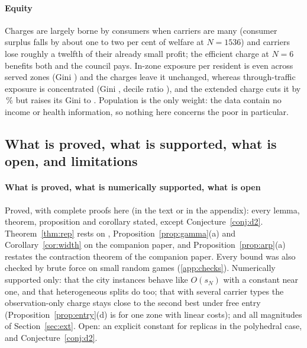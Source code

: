 \documentclass[preprint,11pt,authoryear]{elsarticle}
\theoremstyle{plain}
\theoremstyle{remark}
\begin{document}
\paragraph{Equity} Charges are largely borne by consumers when carriers are many (consumer surplus falls by about one to two per cent of welfare at $N=1536$) and carriers lose roughly a twelfth of their already small profit; the efficient charge at $N=6$ benefits both and the council pays. In-zone exposure per resident is even across served zones (Gini \ExpBigGiniNone) and the charges leave it unchanged, whereas through-traffic exposure is concentrated (Gini \ExpGiniNone, decile ratio \ExpDtenNone), and the extended charge cuts it by \ExpVkmDTour\,\% but raises its Gini to \ExpGiniTour. Population is the only weight: the data contain no income or health information, so nothing here concerns the poor in particular.

\subsection{What is proved, what is supported, what is open, and limitations}

\paragraph{What is proved, what is numerically supported, what is open} Proved, with complete proofs here (in the text or in the appendix): every lemma, theorem, proposition and corollary stated, except Conjecture~\ref{conj:d2}. Theorem~\ref{thm:rep} rests on \citet{Robinson1981}, Proposition~\ref{prop:gamma}(a) and Corollary~\ref{cor:width} on the companion paper, and Proposition~\ref{prop:arp}(a) restates the contraction theorem of the companion paper. Every bound was also checked by brute force on small random games (\ref{app:checks}). Numerically supported only: that the city instances behave like $O(s_N)$ with a constant near one, and that heterogeneous splits do too; that with several carrier types the observation-only charge stays close to the second best under free entry (Proposition~\ref{prop:entry}(d) is for one zone with linear costs); and all magnitudes of Section~\ref{sec:ext}. Open: an explicit constant for replicas in the polyhedral case, and Conjecture~\ref{conj:d2}.
\end{document}
